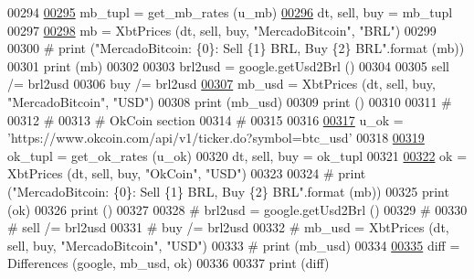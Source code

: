 \begin{DoxyCode}
00294 
\hyperlink{namespaceraw__urlparser_a5d0646d42075b7bea171f53c46c3c938}{00295} mb\_tupl = get\_mb\_rates (u\_mb)
\hyperlink{namespaceraw__urlparser_a9f1ba2a5cd520bb41ac4bee751047679}{00296} dt, sell, buy = mb\_tupl
00297 
\hyperlink{namespaceraw__urlparser_a76acf8d303c15079b0560eace3e9720f}{00298} mb = XbtPrices (dt, sell, buy, \textcolor{stringliteral}{"MercadoBitcoin"}, \textcolor{stringliteral}{"BRL"})
00299 
00300 \textcolor{comment}{# print ("MercadoBitcoin: \{0\}: Sell \{1\} BRL, Buy \{2\} BRL".format (mb))}
00301 \textcolor{keywordflow}{print} (mb)
00302  
00303 brl2usd = google.getUsd2Brl ()
00304 
00305 sell /= brl2usd
00306 buy  /= brl2usd 
\hyperlink{namespaceraw__urlparser_adb426668060d85f4fbd24135e258a8b3}{00307} mb\_usd = XbtPrices (dt, sell, buy, \textcolor{stringliteral}{"MercadoBitcoin"}, \textcolor{stringliteral}{"USD"})
00308 \textcolor{keywordflow}{print} (mb\_usd)
00309 \textcolor{keywordflow}{print} ()
00310 
00311 \textcolor{comment}{#}
00312 \textcolor{comment}{#}
00313 \textcolor{comment}{# OkCoin section }
00314 \textcolor{comment}{# }
00315 
00316 
\hyperlink{namespaceraw__urlparser_a22c1a17803a88426d38d70ad6d4290d2}{00317} u\_ok = \textcolor{stringliteral}{'https://www.okcoin.com/api/v1/ticker.do?symbol=btc\_usd'}
00318 
\hyperlink{namespaceraw__urlparser_a470f476a37f64adb24b58db300e57117}{00319} ok\_tupl = get\_ok\_rates (u\_ok)
00320 dt, sell, buy = ok\_tupl
00321 
\hyperlink{namespaceraw__urlparser_aa0dcadbc04ec5d09f7a2dabb865000c8}{00322} ok = XbtPrices (dt, sell, buy, \textcolor{stringliteral}{"OkCoin"}, \textcolor{stringliteral}{"USD"})
00323 
00324 \textcolor{comment}{# print ("MercadoBitcoin: \{0\}: Sell \{1\} BRL, Buy \{2\} BRL".format (mb))}
00325 \textcolor{keywordflow}{print} (ok)
00326 \textcolor{keywordflow}{print} ()
00327  
00328 \textcolor{comment}{# brl2usd = google.getUsd2Brl ()}
00329 \textcolor{comment}{#}
00330 \textcolor{comment}{# sell /= brl2usd}
00331 \textcolor{comment}{# buy  /= brl2usd }
00332 \textcolor{comment}{# mb\_usd = XbtPrices (dt, sell, buy, "MercadoBitcoin", "USD")}
00333 \textcolor{comment}{# print (mb\_usd)}
00334 
\hyperlink{namespaceraw__urlparser_a86dc49fc55812ccc7eeda441b0fce83c}{00335} diff = Differences (google, mb\_usd, ok)
00336 
00337 \textcolor{keywordflow}{print} (diff)
\end{DoxyCode}
